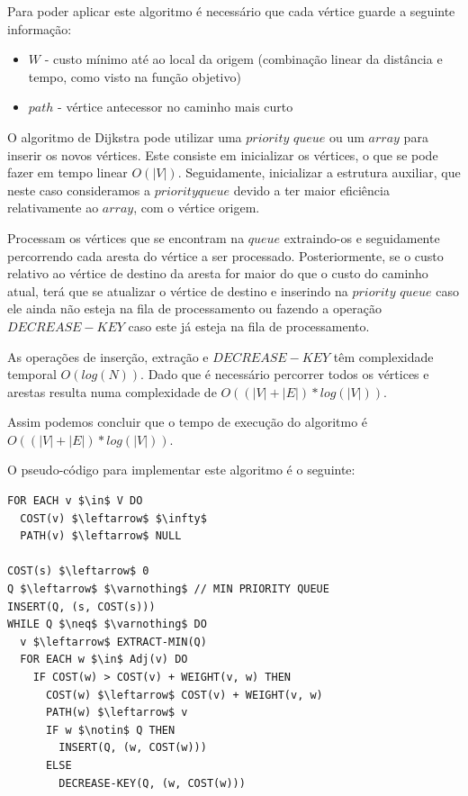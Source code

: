 \documentclass[article, a4paper, 12pt, oneside]{memoir}
\begin{document}
Para poder aplicar este algoritmo é necessário que cada vértice guarde a seguinte informação:
\begin{itemize}
	\item $W$ - custo mínimo até ao local da origem (combinação linear da distância e tempo, como visto na função objetivo)
	\item $path$ - vértice antecessor no caminho mais curto
\end{itemize}

O algoritmo de Dijkstra pode utilizar uma $priority$ $queue$ ou um $array$ para inserir os novos vértices.
Este consiste em inicializar os vértices, o que se pode fazer em tempo linear $O(|V|)$. Seguidamente, inicializar a estrutura auxiliar, que neste caso consideramos a $priority queue$ devido a ter maior eficiência relativamente ao $array$, com o vértice origem.

Processam os vértices que se encontram na $queue$ extraindo-os e seguidamente percorrendo cada aresta do vértice a ser processado. Posteriormente, se o custo relativo ao vértice de destino da aresta for maior do que o custo do caminho atual, terá que se atualizar o vértice de destino e inserindo na $priority$ $queue$ caso ele ainda não esteja na fila de processamento ou fazendo a operação $DECREASE-KEY$ caso este já esteja na fila de processamento.

As operações de inserção, extração e $DECREASE-KEY$ têm complexidade temporal $O(log(N))$. Dado que é necessário percorrer todos os vértices e arestas resulta numa complexidade de $O((|V| + |E|)*log(|V|))$.

Assim podemos concluir que o tempo de execução do algoritmo é $O((|V| + |E|)*log(|V|))$.

\newpage
O pseudo-código para implementar este algoritmo é o seguinte:

\begin{lstlisting}[frame=single, mathescape=true]
FOR EACH v $\in$ V DO
  COST(v) $\leftarrow$ $\infty$
  PATH(v) $\leftarrow$ NULL

COST(s) $\leftarrow$ 0
Q $\leftarrow$ $\varnothing$ // MIN PRIORITY QUEUE
INSERT(Q, (s, COST(s)))
WHILE Q $\neq$ $\varnothing$ DO
  v $\leftarrow$ EXTRACT-MIN(Q)
  FOR EACH w $\in$ Adj(v) DO
    IF COST(w) > COST(v) + WEIGHT(v, w) THEN
      COST(w) $\leftarrow$ COST(v) + WEIGHT(v, w)
      PATH(w) $\leftarrow$ v
      IF w $\notin$ Q THEN
        INSERT(Q, (w, COST(w)))
      ELSE
        DECREASE-KEY(Q, (w, COST(w)))
\end{lstlisting}
\end{document}
